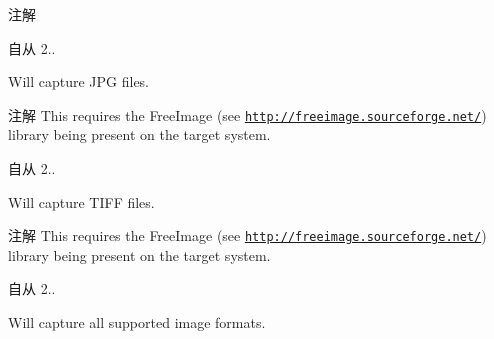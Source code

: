 \begin{Desc}
\begin{description}
\begin{DoxyNote}{注解}
\end{DoxyNote}
\begin{DoxySince}{自从}
2.. 
\end{DoxySince}
\item[{\em 
\hypertarget{group___device_specific_interface_gga5b29826e8e9b1e0b25124f77ac6ff6e5a3c69f34f74e3dc387c6f091da09c7bcd}{vdit\+J\+P\+G}\label{group___device_specific_interface_gga5b29826e8e9b1e0b25124f77ac6ff6e5a3c69f34f74e3dc387c6f091da09c7bcd}
}]Will capture J\+P\+G files. \begin{DoxyNote}{注解}
This requires the Free\+Image (see \href{http://freeimage.sourceforge.net/}{\tt http\+://freeimage.\+sourceforge.\+net/}) library being present on the target system.
\end{DoxyNote}
\begin{DoxySince}{自从}
2.. 
\end{DoxySince}
\item[{\em 
\hypertarget{group___device_specific_interface_gga5b29826e8e9b1e0b25124f77ac6ff6e5ac0ada43bc53fd9820d80df809f3939b9}{vdit\+T\+I\+F\+F}\label{group___device_specific_interface_gga5b29826e8e9b1e0b25124f77ac6ff6e5ac0ada43bc53fd9820d80df809f3939b9}
}]Will capture T\+I\+F\+F files. \begin{DoxyNote}{注解}
This requires the Free\+Image (see \href{http://freeimage.sourceforge.net/}{\tt http\+://freeimage.\+sourceforge.\+net/}) library being present on the target system.
\end{DoxyNote}
\begin{DoxySince}{自从}
2.. 
\end{DoxySince}
\item[{\em 
\hypertarget{group___device_specific_interface_gga5b29826e8e9b1e0b25124f77ac6ff6e5acbf9d68598a28c81739dda7ca206f808}{vdit\+A\+L\+L}\label{group___device_specific_interface_gga5b29826e8e9b1e0b25124f77ac6ff6e5acbf9d68598a28c81739dda7ca206f808}
}]Will capture all supported image formats. \end{description}
\end{Desc}

